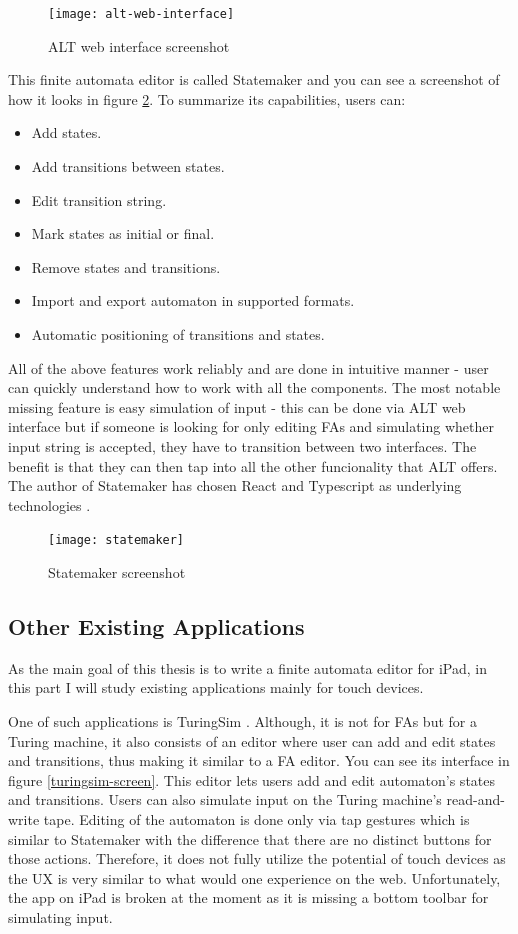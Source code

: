 \begin{figure}
    \texttt{[image: alt-web-interface]}
    \caption{ALT web interface screenshot}\label{alt-web-interface-screen}
\end{figure}

This finite automata editor is called Statemaker and you can see a screenshot of how it looks in figure \ref{statemaker-screen}. To summarize its capabilities, users can:
\begin{itemize}
    \item Add states.
    \item Add transitions between states.
    \item Edit transition string.
    \item Mark states as initial or final.
    \item Remove states and transitions.
    \item Import and export automaton in supported formats.
    \item Automatic positioning of transitions and states.
\end{itemize}
All of the above features work reliably and are done in intuitive manner - user can quickly understand how to work with all the components. The most notable missing feature is easy simulation of input - this can be done via ALT web interface but if someone is looking for only editing FAs and simulating whether input string is accepted, they have to transition between two interfaces. The benefit is that they can then tap into all the other funcionality that ALT offers. The author of Statemaker has chosen React and Typescript as underlying technologies \cite{state-maker}.

\begin{figure}
    \texttt{[image: statemaker]}
    \caption{Statemaker screenshot}\label{statemaker-screen}
\end{figure}

\subsection{Other Existing Applications}

As the main goal of this thesis is to write a finite automata editor for iPad, in this part I will study existing applications mainly for touch devices. 

One of such applications is TuringSim \cite{turingsim}. Although, it is not for FAs but for a Turing machine, it also consists of an editor where user can add and edit states and transitions, thus making it similar to a FA editor. You can see its interface in figure \ref{turingsim-screen}. This editor lets users add and edit automaton's states and transitions. Users can also simulate input on the Turing machine's read-and-write tape. Editing of the automaton is done only via tap gestures which is similar to Statemaker with the difference that there are no distinct buttons for those actions. Therefore, it does not fully utilize the potential of touch devices as the UX is very similar to what would one experience on the web. Unfortunately, the app on iPad is broken at the moment as it is missing a bottom toolbar for simulating input.

